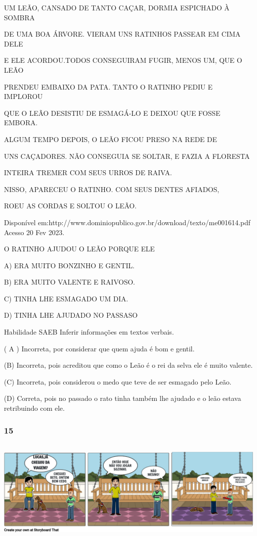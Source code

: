 UM LEÃO, CANSADO DE TANTO CAÇAR, DORMIA ESPICHADO À SOMBRA

DE UMA BOA ÁRVORE. VIERAM UNS RATINHOS PASSEAR EM CIMA DELE

E ELE ACORDOU.TODOS CONSEGUIRAM FUGIR, MENOS UM, QUE O LEÃO

PRENDEU EMBAIXO DA PATA. TANTO O RATINHO PEDIU E IMPLOROU

QUE O LEÃO DESISTIU DE ESMAGÁ-LO E DEIXOU QUE FOSSE EMBORA.

ALGUM TEMPO DEPOIS, O LEÃO FICOU PRESO NA REDE DE

UNS CAÇADORES. NÃO CONSEGUIA SE SOLTAR, E FAZIA A FLORESTA

INTEIRA TREMER COM SEUS URROS DE RAIVA.

NISSO, APARECEU O RATINHO. COM SEUS DENTES AFIADOS,

ROEU AS CORDAS E SOLTOU O LEÃO.

Disponível
em:http://www.dominiopublico.gov.br/download/texto/me001614.pdf Acesso
20 Fev 2023.

O RATINHO AJUDOU O LEÃO PORQUE ELE

A) ERA MUITO BONZINHO E GENTIL.

B) ERA MUITO VALENTE E RAIVOSO.

C) TINHA LHE ESMAGADO UM DIA.

D) TINHA LHE AJUDADO NO PASSASO

Habilidade SAEB Inferir informações em textos verbais.

\protect\hypertarget{_heading=h.37m2jsg}{}{}( A ) Incorreta, por
considerar que quem ajuda é bom e gentil.

(B) Incorreta, pois acreditou que como o Leão é o rei da selva ele é
muito valente.

(C) Incorreta, pois considerou o medo que teve de ser esmagado pelo
Leão.

(D) Correta, pois no passado o rato tinha também lhe ajudado e o leão
estava retribuindo com ele.

\subsubsection{15}\label{section-55}

\includegraphics[width=6.13750in,height=2.02917in]{media/image221.png}

